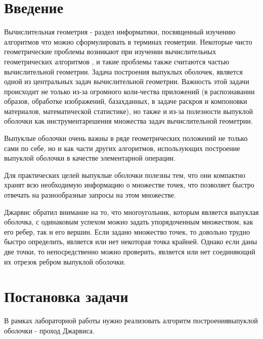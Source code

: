 \documentclass{report}
\begin{document}
\setcounter{page}{2}

\tableofcontents
\newpage

\section*{Введение}
Вычислительная геометрия - раздел информатики, посвященный изучению алгоритмов что можно сформулировать в терминах геометрии. Некоторые чисто геометрические проблемы возникают при изучении вычислительных геометрических алгоритмов , и такие проблемы также считаются частью вычислительной геометрии. Задача построения выпуклых оболочек, является одной из центральных задач вычислительной геометрии. Важность этой задачи происходит не только из-за огромного коли-чества приложений (в распознавании образов, обработке изображений, базахданных, в задаче раскроя и компоновки материалов, математической статистике), но также и из-за полезности выпуклой оболочки как инструментарешения множества задач вычислительной геометрии.

\par Выпуклые оболочки очень важны в ряде геометрических положений не только сами по себе, но и как части других алгоритмов, использующих построение выпуклой оболочки в качестве элементарной операции.

\par Для практических целей выпуклые оболочки полезны тем, что они компактно хранят всю необходимую информацию о множестве точек, что позволяет быстро отвечать на разнообразные запросы на этом множестве.

\par Джарвис обратил внимание на то, что многоугольник, которым является выпуклая оболочка, с одинаковым успехом можно задать упорядоченным множеством,
как его ребер, так и его вершин. Если задано множество точек, то довольно трудно быстро
определить, является или нет некоторая точка крайней. Однако если даны две точки, то непосредственно можно проверить, является или нет соединяющий их отрезок ребром выпуклой оболочки. 

\newpage

\section*{Постановка задачи}
В рамках лабораторной работы нужно реализовать алгоритм построениявыпуклой оболочки - проход Джарвиса.
\end{document}
